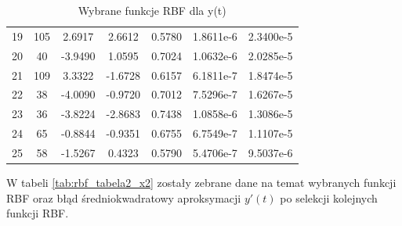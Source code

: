 \begin{table}[ht!]
\begin{tabular}{ |c| c| c| c| c| c| c| }
   19 & 105 &   2.6917 &   2.6612 &   0.5780  &  1.8611e-6 & 2.3400e-5 \\
   20 &  40 &  -3.9490 &   1.0595 &   0.7024  &  1.0632e-6 & 2.0285e-5 \\
   21 & 109 &   3.3322 &  -1.6728 &   0.6157  &  6.1811e-7 & 1.8474e-5 \\
   22 &  38 &  -4.0090 &  -0.9720 &   0.7012  &  7.5296e-7 & 1.6267e-5 \\
   23 &  36 &  -3.8224 &  -2.8683 &   0.7438  &  1.0858e-6 & 1.3086e-5 \\
   24 &  65 &  -0.8844 &  -0.9351 &   0.6755  &  6.7549e-7 & 1.1107e-5 \\
   25 &  58 &  -1.5267 &   0.4323 &   0.5790  &  5.4706e-7 & 9.5037e-6 \\    \hline
\end{tabular}

\caption{Wybrane funkcje RBF dla y(t)}
\label{tab:rbf_tabela2_x1}
\end{table}


W tabeli \ref{tab:rbf_tabela2_x2} zostały zebrane dane na temat wybranych funkcji RBF oraz błąd średniokwadratowy aproksymacji $y'(t)$ po selekcji kolejnych funkcji RBF.

